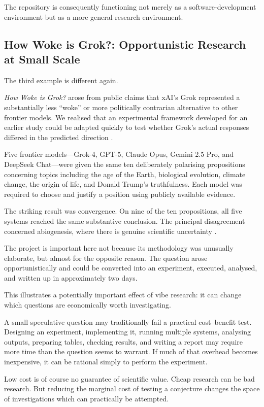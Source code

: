 The repository is consequently functioning not merely as a software-development environment but as a more general research environment.


\subsection{How Woke is Grok?: Opportunistic Research at Small Scale}

The third example is different again.

\emph{How Woke is Grok?} arose from public claims that xAI's Grok represented a substantially less ``woke'' or more politically contrarian alternative to other frontier models. We realised that an experimental framework developed for an earlier study could be adapted quickly to test whether Grok's actual responses differed in the predicted direction \citep{raynerChatGPT2025grok}.

Five frontier models---Grok-4, GPT-5, Claude Opus, Gemini 2.5 Pro, and DeepSeek Chat---were given the same ten deliberately polarising propositions concerning topics including the age of the Earth, biological evolution, climate change, the origin of life, and Donald Trump's truthfulness. Each model was required to choose and justify a position using publicly available evidence.

The striking result was convergence. On nine of the ten propositions, all five systems reached the same substantive conclusion. The principal disagreement concerned abiogenesis, where there is genuine scientific uncertainty \citep{raynerChatGPT2025grok}.

The project is important here not because its methodology was unusually elaborate, but almost for the opposite reason. The question arose opportunistically and could be converted into an experiment, executed, analysed, and written up in approximately two days.

This illustrates a potentially important effect of vibe research: it can change which questions are economically worth investigating.

A small speculative question may traditionally fail a practical cost--benefit test. Designing an experiment, implementing it, running multiple systems, analysing outputs, preparing tables, checking results, and writing a report may require more time than the question seems to warrant. If much of that overhead becomes inexpensive, it can be rational simply to perform the experiment.

Low cost is of course no guarantee of scientific value. Cheap research can be bad research. But reducing the marginal cost of testing a conjecture changes the space of investigations which can practically be attempted.


